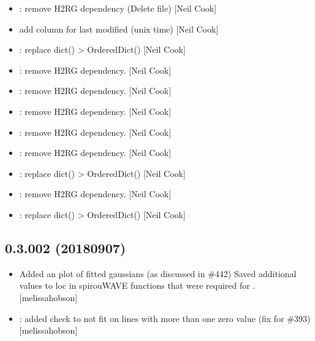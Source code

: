 \documentclass[a4paper,10pt,english]{report}
\begin{document}
\begin{itemize}
\item {} 
: remove H2RG dependency (Delete file) {[}Neil
Cook{]}

\item {} 
 \sphinxhyphen{} add column for last modified (unix time)
{[}Neil Cook{]}

\item {} 
: replace dict() \textendash{}\textgreater{} OrderedDict() {[}Neil Cook{]}

\item {} 
: remove H2RG dependency. {[}Neil Cook{]}

\item {} 
: remove H2RG dependency. {[}Neil Cook{]}

\item {} 
: remove H2RG dependency. {[}Neil Cook{]}

\item {} 
: remove H2RG dependency. {[}Neil Cook{]}

\item {} 
: remove H2RG dependency. {[}Neil Cook{]}

\item {} 
: replace dict() \textendash{}\textgreater{} OrderedDict() {[}Neil Cook{]}

\item {} 
: remove H2RG dependency. {[}Neil Cook{]}

\item {} 
: replace dict() \textendash{}\textgreater{} OrderedDict() {[}Neil Cook{]}

\end{itemize}


\subsection{0.3.002 (2018\sphinxhyphen{}09\sphinxhyphen{}07)}
\label{\detokenize{misc/changelog:id351}}\begin{itemize}
\item {} 
Added an  plot of fitted gaussians (as discussed in \#442)
Saved additional values to loc in spirouWAVE functions that were
required for . {[}melissa\sphinxhyphen{}hobson{]}

\item {} 
: added check to not fit on lines with more than one zero\sphinxhyphen{}
value (fix for \#393) {[}melissa\sphinxhyphen{}hobson{]}

\end{itemize}
\end{document}
